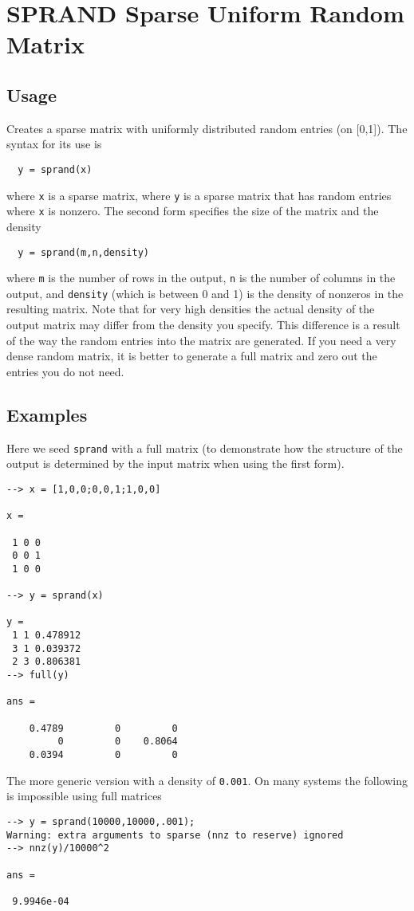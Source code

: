 \section{SPRAND Sparse Uniform Random Matrix}

\subsection{Usage}

Creates a sparse matrix with uniformly distributed random entries (on [0,1]).  The
syntax for its use is
\begin{verbatim}
  y = sprand(x)
\end{verbatim}
where \verb|x| is a sparse matrix, where \verb|y| is a sparse matrix that has
random entries where \verb|x| is nonzero.  The second form specifies the
size of the matrix and the density
\begin{verbatim}
  y = sprand(m,n,density)
\end{verbatim}
where \verb|m| is the number of rows in the output, \verb|n| is the number of 
columns in the output, and \verb|density| (which is between 0 and 1) is
the density of nonzeros in the resulting matrix.  Note that for very
high densities the actual density of the output matrix may differ from
the density you specify.  This difference is a result of the way the
random entries into the matrix are generated.  If you need a very dense
random matrix, it is better to generate a full matrix and zero out the 
entries you do not need.
\subsection{Examples}

Here we seed \verb|sprand| with a full matrix (to demonstrate how the structure
of the output is determined by the input matrix when using the first form).
\begin{verbatim}
--> x = [1,0,0;0,0,1;1,0,0]

x = 

 1 0 0 
 0 0 1 
 1 0 0 

--> y = sprand(x)

y = 
 1 1 0.478912
 3 1 0.039372
 2 3 0.806381
--> full(y)

ans = 

    0.4789         0         0 
         0         0    0.8064 
    0.0394         0         0 
\end{verbatim}
The more generic version with a density of \verb|0.001|.  On many systems the
following is impossible using full matrices
\begin{verbatim}
--> y = sprand(10000,10000,.001);
Warning: extra arguments to sparse (nnz to reserve) ignored
--> nnz(y)/10000^2

ans = 

 9.9946e-04 
\end{verbatim}
